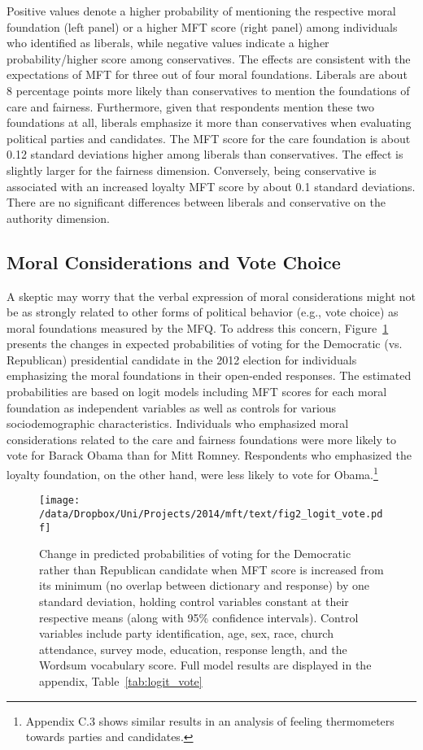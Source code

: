 Positive values denote a higher probability of mentioning the respective moral foundation (left panel) or a higher MFT score (right panel) among individuals who identified as liberals, while negative values indicate a higher probability/higher score among conservatives. The effects are consistent with the expectations of MFT for three out of four moral foundations. Liberals are about 8 percentage points more likely than conservatives to mention the foundations of care and fairness. Furthermore, given that respondents mention these two foundations at all, liberals emphasize it more than conservatives when evaluating political parties and candidates. The MFT score for the care foundation is about 0.12 standard deviations higher among liberals than conservatives. The effect is slightly larger for the fairness dimension. Conversely, being conservative is associated with an increased loyalty MFT score by about 0.1 standard deviations. There are no significant differences between liberals and conservative on the authority dimension.


\subsection{Moral Considerations and Vote Choice}

A skeptic may worry that the verbal expression of moral considerations might not be as strongly related to other forms of political behavior (e.g., vote choice) as moral foundations measured by the MFQ. To address this concern, Figure~\ref{fig:logit_vote} presents the changes in expected probabilities of voting for the Democratic (vs. Republican) presidential candidate in the 2012 election for individuals emphasizing the moral foundations in their open-ended responses. The estimated probabilities are based on logit models including MFT scores for each moral foundation as independent variables as well as controls for various sociodemographic characteristics. Individuals who emphasized moral considerations related to the care and fairness foundations were more likely to vote for Barack Obama than for Mitt Romney. Respondents who emphasized the loyalty foundation, on the other hand, were less likely to vote for Obama.\footnote{Appendix C.3 shows similar results in an analysis of feeling thermometers towards parties and candidates.}

\begin{figure}[ht]\centering
\texttt{[image: /data/Dropbox/Uni/Projects/2014/mft/text/fig2\_logit\_vote.pdf]}
\caption[Effect of moral considerations on predicted probabilities of voting for the Democratic rather than Republican candidate conditional]{Change in predicted probabilities of voting for the Democratic rather than Republican candidate when MFT score is increased from its minimum (no overlap between dictionary and response) by one standard deviation, holding control variables constant at their respective means (along with 95\% confidence intervals). Control variables include party identification, age, sex, race, church attendance, survey mode, education, response length, and the Wordsum vocabulary score. Full model results are displayed in the appendix, Table~\ref{tab:logit_vote}
}\label{fig:logit_vote}
\end{figure}

